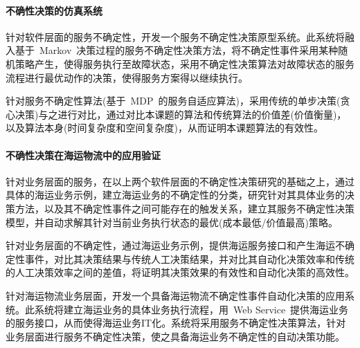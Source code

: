 \paragraph{不确性决策的仿真系统}

针对软件层面的服务不确定性，开发一个服务不确定性决策原型系统。此系统将融入基于~Markov~决策过程的服务不确定性决策方法，将不确定性事件采用某种随机策略产生，使得服务执行至故障状态，采用不确定性决策算法对故障状态的服务流程进行最优动作的决策，使得服务方案得以继续执行。

针对服务不确定性算法(基于~MDP~的服务自适应算法)，采用传统的单步决策(贪心决策)与之进行对比，通过对比本课题的算法和传统算法的价值差(价值衡量)，以及算法本身(时间复杂度和空间复杂度)，从而证明本课题算法的有效性。

\paragraph{不确性决策在海运物流中的应用验证}

针对业务层面的服务，在以上两个软件层面的不确定性决策研究的基础之上，通过具体的海运业务示例，建立海运业务的不确定性的分类，研究针对其具体业务的决策方法，以及其不确定性事件之间可能存在的触发关系，建立其服务不确定性决策模型，并自动求解其针对当前业务执行状态的最优(成本最低/价值最高)策略。

针对业务层面的不确定性，通过海运业务示例，提供海运服务接口和产生海运不确定性事件，对比其决策结果与传统人工决策结果，并对比其自动化决策效率和传统的人工决策效率之间的差值，将证明其决策效果的有效性和自动化决策的高效性。

针对海运物流业务层面，开发一个具备海运物流不确定性事件自动化决策的应用系统。此系统将建立海运业务的具体业务执行流程，用~Web Service~提供海运业务的服务接口，从而使得海运业务IT化。系统将采用服务不确定性决策算法，针对业务层面进行服务不确定性决策，使之具备海运业务不确定性的自动决策功能。
